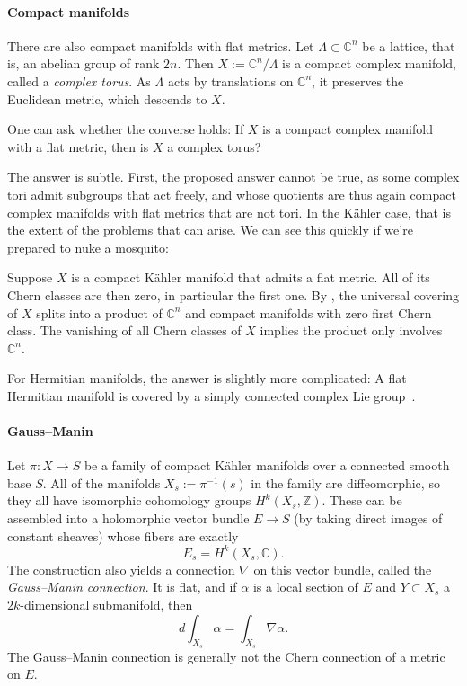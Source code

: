 \documentclass[11pt]{article}
\newcommand{\kk}[1]{\mathbb{#1}}
\begin{document}
\paragraph{Compact manifolds}

There are also compact manifolds with flat metrics. Let $\Lambda \subset \kk C^n$ be a lattice, that is, an abelian group of rank $2n$. Then $X := \kk C^n / \Lambda$ is a compact complex manifold, called a \emph{complex torus}. As $\Lambda$ acts by translations on $\kk C^n$, it preserves the Euclidean metric, which descends to $X$.

One can ask whether the converse holds: If $X$ is a compact complex manifold with a flat metric, then is $X$ a complex torus?

The answer is subtle. First, the proposed answer cannot be true, as some complex tori admit subgroups that act freely, and whose quotients are thus again compact complex manifolds with flat metrics that are not tori. In the K\"ahler case, that is the extent of the problems that can arise. We can see this quickly if we're prepared to nuke a mosquito:

Suppose $X$ is a compact K\"ahler manifold that admits a flat metric. All of its Chern classes are then zero, in particular the first one. By \cite{beauville1983}, the universal covering of $X$ splits into a product of $\kk C^n$ and compact manifolds with zero first Chern class. The vanishing of all Chern classes of $X$ implies the product only involves $\kk C^n$.

For Hermitian manifolds, the answer is slightly more complicated: A flat Hermitian manifold is covered by a simply connected complex Lie group~\cite{boothby1958}.


\paragraph{Gauss--Manin}


Let $\pi : X \to S$ be a family of compact K\"ahler manifolds over a connected smooth base $S$. All of the manifolds $X_s := \pi^{-1}(s)$ in the family are diffeomorphic, so they all have isomorphic cohomology groups $H^k(X_s, \kk Z)$. These can be assembled into a holomorphic vector bundle $E \to S$ (by taking direct images of constant sheaves) whose fibers are exactly
$$
E_s = H^k(X_s, \kk C).
$$
The construction also yields a connection $\nabla$ on this vector bundle, called the \emph{Gauss--Manin connection}. It is flat, and if $\alpha$ is a local section of $E$ and $Y \subset X_s$ a $2k$-dimensional submanifold, then
$$
d \! \int_{X_s}\!\!\!\! \alpha = \int_{X_s} \!\!\! \nabla \alpha.
$$
The Gauss--Manin connection is generally not the Chern connection of a metric on $E$.
\end{document}
